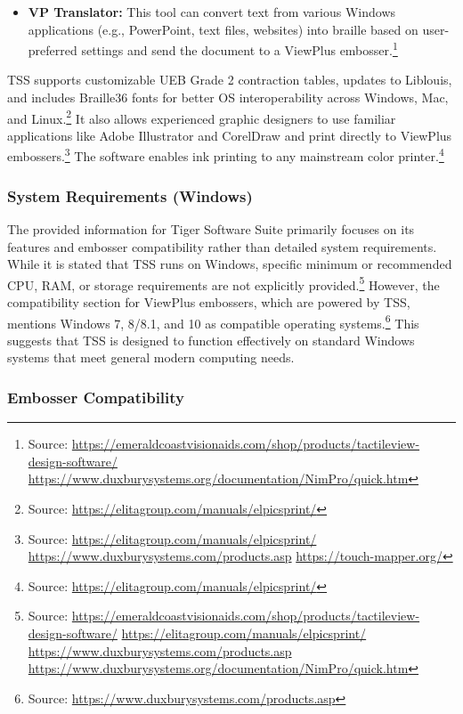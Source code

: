 \begin{itemize}
    \item \textbf{VP Translator:} This tool can convert text from various Windows applications (e.g., PowerPoint, text files, websites) into braille based on user-preferred settings and send the document to a ViewPlus embosser.\footnote{Source:  \url{https://emeraldcoastvisionaids.com/shop/products/tactileview-design-software/} \url{https://www.duxburysystems.org/documentation/NimPro/quick.htm}}
\end{itemize}

TSS supports customizable UEB Grade 2 contraction tables, updates to Liblouis, and includes Braille36 fonts for better OS interoperability across Windows, Mac, and Linux.\footnote{Source:  \url{https://elitagroup.com/manuals/elpicsprint/}} It also allows experienced graphic designers to use familiar applications like Adobe Illustrator and CorelDraw and print directly to ViewPlus embossers.\footnote{Source:  \url{https://elitagroup.com/manuals/elpicsprint/} \url{https://www.duxburysystems.com/products.asp} \url{https://touch-mapper.org/}} The software enables ink printing to any mainstream color printer.\footnote{Source:  \url{https://elitagroup.com/manuals/elpicsprint/}}

\subsubsection{System Requirements (Windows)}

The provided information for Tiger Software Suite primarily focuses on its features and embosser compatibility rather than detailed system requirements. While it is stated that TSS runs on Windows, specific minimum or recommended CPU, RAM, or storage requirements are not explicitly provided.\footnote{Source:  \url{https://emeraldcoastvisionaids.com/shop/products/tactileview-design-software/} \url{https://elitagroup.com/manuals/elpicsprint/} \url{https://www.duxburysystems.com/products.asp} \url{https://www.duxburysystems.org/documentation/NimPro/quick.htm}} However, the compatibility section for ViewPlus embossers, which are powered by TSS, mentions Windows 7, 8/8.1, and 10 as compatible operating systems.\footnote{Source:  \url{https://www.duxburysystems.com/products.asp}} This suggests that TSS is designed to function effectively on standard Windows systems that meet general modern computing needs.

\subsubsection{Embosser Compatibility}

